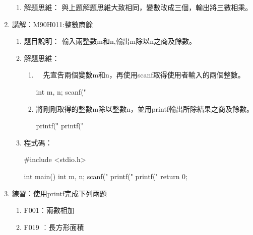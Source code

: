 \begin{enumerate}
\begin{enumerate}
			\item 解題思維：
			\subitem 與上題解題思維大致相同，變數改成三個，輸出將三數相乘。

		\end{enumerate}
		
	\item 講解︰M90H011:整數商餘%
		\begin{enumerate}
			\item 題目說明：
			\subitem 
			輸入兩整數m和n,輸出m除以n之商及餘數。
			\item 解題思維：
			\begin{enumerate}
			\item 　先宣告兩個變數m和n，再使用scanf取得使用者輸入的兩個整數。
			\begin{inside}
			int m, n;
			scanf("%
			\end{inside}
			\item  將剛剛取得的整數m除以整數n，並用printf輸出所除結果之商及餘數。
			\begin{inside}
			printf("\n%
			printf("\n%
			\end{inside}
			\end{enumerate}
			
			\item 程式碼：
			\begin{cppcode}
				#include <stdio.h>
				
				int main()
				{
					int m, n;
					scanf("%
					printf("\n%
					printf("\n%
					return 0;
				}
			\end{cppcode}
		\end{enumerate}
	
	\item 練習︰使用printf完成下列兩題
	\begin{enumerate}
		\item F001︰兩數相加
		\item F019 ︰長方形面積
	\end{enumerate}
\end{enumerate}


